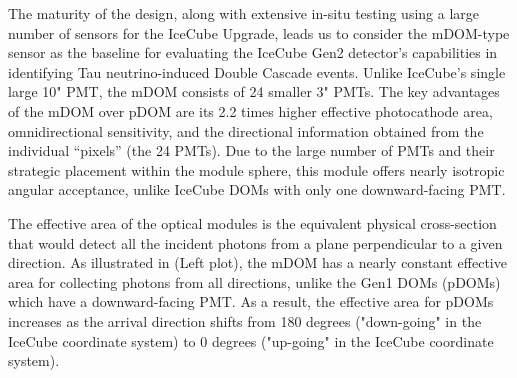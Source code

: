 
The maturity of the design, along with extensive in-situ testing using a large number of sensors for the IceCube Upgrade, leads us to consider the mDOM-type sensor as the baseline for evaluating the IceCube Gen2 detector's capabilities in identifying Tau neutrino-induced Double Cascade events. Unlike IceCube’s single large 10" PMT, the mDOM consists of 24 smaller 3" PMTs. The key advantages of the mDOM over pDOM  are its 2.2 times higher effective photocathode area, omnidirectional sensitivity, and the directional information obtained from the individual “pixels” (the 24 PMTs). Due to the large number of PMTs and their strategic placement within the module sphere, this module offers nearly isotropic angular acceptance, unlike IceCube DOMs with only one downward-facing PMT. 

The effective area of the optical modules is the equivalent physical cross-section that would detect all the incident photons from a plane perpendicular to a given direction. As illustrated in  (Left plot), the mDOM has a nearly constant effective area for collecting photons from all directions, unlike the Gen1 DOMs (pDOMs) which have a downward-facing PMT. As a result, the effective area for pDOMs increases as the arrival direction shifts from 180 degrees ("down-going" in the IceCube coordinate system) to 0 degrees ("up-going" in the IceCube coordinate system).

